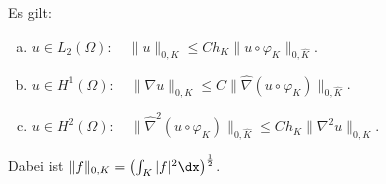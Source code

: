 \begin{Lemma}
    \label{lem:3.13}
    Es gilt:
    \begin{enumerate}[a)]
      \item
        $u \in L_2(\Omega): \quad
            \|u\|_{0,K}
        \le C h_K \|u \circ \varphi_K\|_{0,\hat K}$.
      \item
        $u \in H^1(\Omega): \quad
            \|\nabla u\|_{0,K}
        \le C \|\hat \nabla (u \circ \varphi_K)\|_{0,\hat K}$.
      \item
        $u \in H^2(\Omega): \quad
            \|\hat \nabla^2 (u \circ \varphi_K)\|_{0,\hat K}
        \le C h_K \|\nabla^2 u\|_{0,K}$.
    \end{enumerate}
    Dabei ist $\|f\|_{0,K} = \left(\int_K |f|^2 \dx\right)^\frac{1}{2}$.
\end{Lemma}


